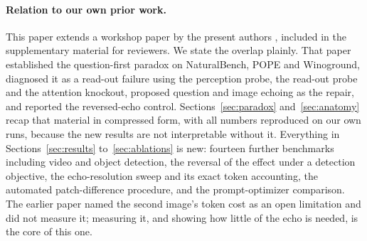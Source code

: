 \paragraph{Relation to our own prior work.} This paper extends a workshop paper
by the present authors \citep{anon-workshop}, included in the supplementary
material for reviewers. We state the overlap plainly. That paper established the
question-first paradox on NaturalBench, POPE and Winoground, diagnosed it as a
read-out failure using the perception probe, the read-out probe and the
attention knockout, proposed question and image echoing as the repair, and
reported the reversed-echo control. Sections~\ref{sec:paradox}
and~\ref{sec:anatomy} recap that material in compressed form, with all numbers
reproduced on our own runs, because the new results are not interpretable
without it. Everything in Sections~\ref{sec:results} to~\ref{sec:ablations} is
new: fourteen further benchmarks including video and object detection, the
reversal of the effect under a detection objective, the echo-resolution sweep
and its exact token accounting, the automated patch-difference procedure, and
the prompt-optimizer comparison. The earlier paper named the second image's
token cost as an open limitation and did not measure it; measuring it, and
showing how little of the echo is needed, is the core of this one.
